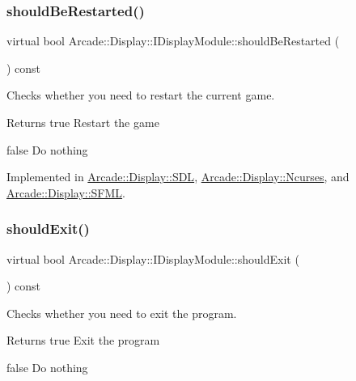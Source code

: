 \subsubsection{\texorpdfstring{shouldBeRestarted()}{shouldBeRestarted()}}
{\footnotesize\ttfamily virtual bool Arcade\+::\+Display\+::\+I\+Display\+Module\+::should\+Be\+Restarted (\begin{DoxyParamCaption}{ }\end{DoxyParamCaption}) const\hspace{0.3cm}{\ttfamily [pure virtual]}}



Checks whether you need to restart the current game. 

\begin{DoxyReturn}{Returns}
true Restart the game 

false Do nothing 
\end{DoxyReturn}


Implemented in \mbox{\hyperlink{classArcade_1_1Display_1_1SDL_aaeeb1aa505c0eab3c8b5c34265c89845}{Arcade\+::\+Display\+::\+S\+DL}}, \mbox{\hyperlink{classArcade_1_1Display_1_1Ncurses_aa675198d68cb93fdf94686aa1e60605c}{Arcade\+::\+Display\+::\+Ncurses}}, and \mbox{\hyperlink{classArcade_1_1Display_1_1SFML_a7c276ccbf48700092eb637d73b78e0d1}{Arcade\+::\+Display\+::\+S\+F\+ML}}.

\mbox{\label{classArcade_1_1Display_1_1IDisplayModule_a550877fb92d58325404b9ebe9e71f6ff}} 
\subsubsection{\texorpdfstring{shouldExit()}{shouldExit()}}
{\footnotesize\ttfamily virtual bool Arcade\+::\+Display\+::\+I\+Display\+Module\+::should\+Exit (\begin{DoxyParamCaption}{ }\end{DoxyParamCaption}) const\hspace{0.3cm}{\ttfamily [pure virtual]}}



Checks whether you need to exit the program. 

\begin{DoxyReturn}{Returns}
true Exit the program 

false Do nothing 
\end{DoxyReturn}


